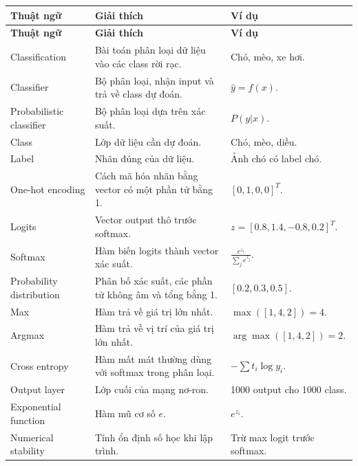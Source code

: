 \small
\begin{longtable}{p{}p{}p{}}
\toprule
\textbf{Thuật ngữ} & \textbf{Giải thích} & \textbf{Ví dụ} \\
\midrule
\endfirsthead

\toprule
\textbf{Thuật ngữ} & \textbf{Giải thích} & \textbf{Ví dụ} \\
\midrule
\endhead

Classification & Bài toán phân loại dữ liệu vào các class rời rạc. & Chó, mèo, xe hơi. \\

Classifier & Bộ phân loại, nhận input và trả về class dự đoán. & $\hat{y}=f(x)$. \\

Probabilistic classifier & Bộ phân loại dựa trên xác suất. & $P(y|x)$. \\

Class & Lớp dữ liệu cần dự đoán. & Chó, mèo, diều. \\

Label & Nhãn đúng của dữ liệu. & Ảnh chó có label chó. \\

One-hot encoding & Cách mã hóa nhãn bằng vector có một phần tử bằng 1. & $[0,1,0,0]^T$. \\

Logits & Vector output thô trước softmax. & $z=[0.8,1.4,-0.8,0.2]^T$. \\

Softmax & Hàm biến logits thành vector xác suất. & $\frac{e^{z_i}}{\sum_j e^{z_j}}$. \\

Probability distribution & Phân bố xác suất, các phần tử không âm và tổng bằng 1. & $[0.2,0.3,0.5]$. \\

Max & Hàm trả về giá trị lớn nhất. & $\max([1,4,2])=4$. \\

Argmax & Hàm trả về vị trí của giá trị lớn nhất. & $\arg\max([1,4,2])=2$. \\

Cross entropy & Hàm mất mát thường dùng với softmax trong phân loại. & $-\sum t_i\log y_i$. \\

Output layer & Lớp cuối của mạng nơ-ron. & 1000 output cho 1000 class. \\

Exponential function & Hàm mũ cơ số $e$. & $e^{z_i}$. \\

Numerical stability & Tính ổn định số học khi lập trình. & Trừ max logit trước softmax. \\

\bottomrule
\end{longtable}
\normalsize

